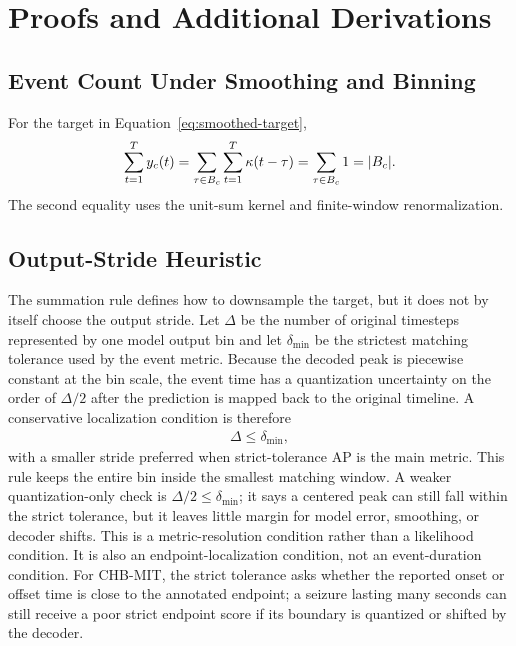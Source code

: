\begin{center}
\centering
\label{tab:state-reconstruction}
\resizebox{0.94\textwidth}{!}{%

}
\end{center}

\clearpage
\section{Proofs and Additional Derivations}
\label{app:derivation}

\subsection{Event Count Under Smoothing and Binning}

For the target in Equation~\ref{eq:smoothed-target},
\begin{align}
    \sum_{t=1}^{T} y_c(t)
    =
    \sum_{\tau\in B_c}\sum_{t=1}^{T}\kappa(t-\tau)
    =
    \sum_{\tau\in B_c}1
    =
    |B_c|.
\end{align}
The second equality uses the unit-sum kernel and finite-window renormalization.

\subsection{Output-Stride Heuristic}

The summation rule defines how to downsample the target, but it does not by
itself choose the output stride.
Let $\Delta$ be the number of original timesteps represented by one model
output bin and let $\delta_{\min}$ be the strictest matching tolerance used by
the event metric.
Because the decoded peak is piecewise constant at the bin scale, the event time
has a quantization uncertainty on the order of $\Delta/2$ after the prediction
is mapped back to the original timeline.
A conservative localization condition is therefore
\begin{align}
    \Delta \le \delta_{\min},
\end{align}
with a smaller stride preferred when strict-tolerance AP is the main metric.
This rule keeps the entire bin inside the smallest matching window.
A weaker quantization-only check is $\Delta/2\le\delta_{\min}$; it says a
centered peak can still fall within the strict tolerance, but it leaves little
margin for model error, smoothing, or decoder shifts.
This is a metric-resolution condition rather than a likelihood condition.
It is also an endpoint-localization condition, not an event-duration condition.
For CHB-MIT, the strict tolerance asks whether the reported onset or offset
time is close to the annotated endpoint; a seizure lasting many seconds can
still receive a poor strict endpoint score if its boundary is quantized or
shifted by the decoder.

